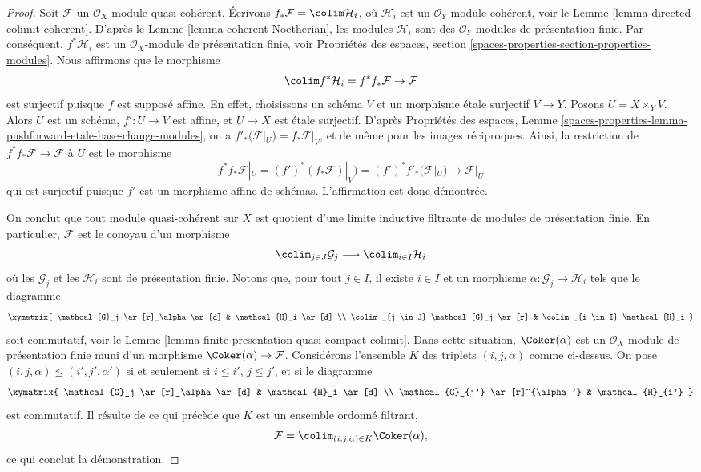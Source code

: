 \begin{proof}
Soit $\mathcal{F}$ un $\mathcal{O}_X$-module quasi-cohérent.
Écrivons $f_*\mathcal{F} = \colim \mathcal{H}_i$, où $\mathcal{H}_i$ est
un $\mathcal{O}_Y$-module cohérent, voir le
Lemme \ref{lemma-directed-colimit-coherent}.
D'après le Lemme \ref{lemma-coherent-Noetherian}, les modules $\mathcal{H}_i$
sont des $\mathcal{O}_Y$-modules de présentation finie. Par conséquent,
$f^*\mathcal{H}_i$ est un $\mathcal{O}_X$-module de présentation finie, voir
Propriétés des espaces, section
\ref{spaces-properties-section-properties-modules}.
Nous affirmons que le morphisme
$$
\colim f^*\mathcal{H}_i = f^*f_*\mathcal{F} \to \mathcal{F}
$$
est surjectif puisque $f$ est supposé affine. En effet, choisissons
un schéma $V$ et un morphisme \'etale surjectif $V \to Y$. Posons
$U = X \times_Y V$. Alors $U$ est un schéma, $f' : U \to V$ est affine, et
$U \to X$ est \'etale surjectif. D'après
Propriétés des espaces, Lemme
\ref{spaces-properties-lemma-pushforward-etale-base-change-modules},
on a $f'_*(\mathcal{F}|_U) = f_*\mathcal{F}|_V$, et de même
pour les images réciproques. Ainsi, la restriction de $f^*f_*\mathcal{F} \to \mathcal{F}$
à $U$ est le morphisme
$$
f^*f_*\mathcal{F}|_U = (f')^*(f_*\mathcal{F})|_V) =
(f')^*f'_*(\mathcal{F}|_U) \to \mathcal{F}|_U
$$
qui est surjectif puisque $f'$ est un morphisme affine de schémas.
L'affirmation est donc démontrée.

\medskip\noindent
On conclut que tout module quasi-cohérent sur $X$ est quotient d'une
limite inductive filtrante de modules de présentation finie. En particulier,
$\mathcal{F}$ est le conoyau d'un morphisme
$$
\colim_{j \in J} \mathcal{G}_j \longrightarrow \colim_{i \in I} \mathcal{H}_i
$$
où les $\mathcal{G}_j$ et les $\mathcal{H}_i$ sont de présentation finie. Notons
que, pour tout $j \in I$, il existe $i \in I$ et un morphisme
$\alpha : \mathcal{G}_j \to \mathcal{H}_i$ tels que le diagramme
$$
\xymatrix{
\mathcal{G}_j \ar[r]_\alpha \ar[d] & \mathcal{H}_i \ar[d] \\
\colim_{j \in J} \mathcal{G}_j \ar[r] &
\colim_{i \in I} \mathcal{H}_i
}
$$
soit commutatif, voir le
Lemme \ref{lemma-finite-presentation-quasi-compact-colimit}.
Dans cette situation, $\Coker(\alpha)$ est un
$\mathcal{O}_X$-module de présentation finie muni d'un morphisme
$\Coker(\alpha) \to \mathcal{F}$. Considérons l'ensemble $K$ des
triplets $(i, j, \alpha)$ comme ci-dessus. On pose
$(i, j, \alpha) \leq (i', j', \alpha')$ si et seulement si
$i \leq i'$, $j \leq j'$, et si le diagramme
$$
\xymatrix{
\mathcal{G}_j \ar[r]_\alpha \ar[d] & \mathcal{H}_i \ar[d] \\
\mathcal{G}_{j'} \ar[r]^{\alpha'} &
\mathcal{H}_{i'}
}
$$
est commutatif. Il résulte de ce qui précède que $K$ est
un ensemble ordonné filtrant,
$$
\mathcal{F} = \colim_{(i, j, \alpha) \in K} \Coker(\alpha),
$$
ce qui conclut la démonstration.
\end{proof}







